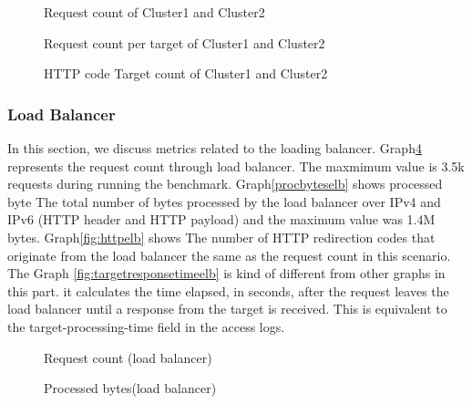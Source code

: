 \documentclass[12pt]{article}
\begin{document}
                \begin{figure}[htpb]
                \centering
                    \caption{Request count of Cluster1 and Cluster2}
                    \label{fig:reqtimecountc12}
                \end{figure}
                \begin{figure}[htpb]
                \centering
                    \caption{Request count per target of Cluster1 and Cluster2}
                    \label{fig:reqtargetcount}
                \end{figure}
                \begin{figure}[htpb]
                \centering
                    \caption{HTTP code Target count of Cluster1 and Cluster2}
                    \label{fig:httpcountc12}
                \end{figure}
           


        
        \subsubsection{Load Balancer}
        In this section, we discuss metrics related to the loading balancer. Graph\ref{fig:requescountelb} represents the request count through load balancer. The maxmimum value is 3.5k requests during running the benchmark. Graph\ref{procbyteselb} shows processed byte The total number of bytes processed by the load balancer over IPv4 and IPv6 (HTTP header and HTTP payload) and the maximum value was 1.4M bytes. Graph\ref{fig:httpelb} shows The number of HTTP redirection codes that originate from the load balancer the same as the request count in this scenario. \\
        The Graph \ref{fig:targetresponsetimeelb} is kind of different from other graphs in this part. it calculates the time elapsed, in seconds, after the request leaves the load balancer until a response from the target is received. This is equivalent to the target-processing-time field in the access logs.
            \begin{figure}[htpb]
                \centering
                    \caption{Request count (load balancer)}
                    \label{fig:requescountelb}
                \end{figure}
                \begin{figure}[htpb]
                \centering
                    \caption{Processed bytes(load balancer)}
                    \label{fig:procbyteselb}
                \end{figure}
\end{document}
